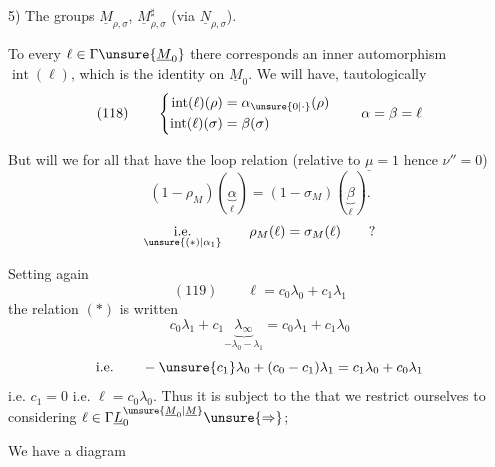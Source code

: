 
5) The groups $\underline M_{\rho,\sigma}$, $\underline M_{\rho,\sigma}^{\sharp}$ (via $\underline N_{\rho,\sigma}$).

To every $\ell\in\Gamma\unsure{\underline M_0}$ there corresponds an inner automorphism $\operatorname{int}(\ell)$, which is the identity on $\underline M_0$. We will have, tautologically
\[
(118)\qquad
\left\{\begin{aligned}
\operatorname{int}(\ell)(\rho)&=\alpha_{\unsure{0|\cdot}}(\rho)\\
\operatorname{int}(\ell)(\sigma)&=\beta(\sigma)
\end{aligned}\right.
\qquad\alpha=\beta=\ell
\]

But  will we for all that have the loop relation (relative to $\underline\mu=1$ hence $\nu''=0$)
\[
(1-\rho_M)(\underbrace{\alpha}_{\ell})=(1-\sigma_M)(\underbrace{\beta}_{\ell}).
\]
\[
\underset{\unsure{(*)|\alpha_1}}{\text{i.e.}}\qquad
\rho_M(\ell)=\sigma_M(\ell)\qquad ?
\]

Setting again
\[
(119)\qquad\ell=c_0\lambda_0+c_1\lambda_1
\]
the relation $(*)$ is written
\[
c_0\lambda_1+c_1\underbrace{\lambda_\infty}_{-\lambda_0-\lambda_1}
=c_0\lambda_1+c_1\lambda_0
\]
\[
\text{i.e.}\qquad-\unsure{c_1}\lambda_0+(c_0-c_1)\lambda_1
=c_1\lambda_0+c_0\lambda_1
\]
i.e. $c_1=0$ i.e. $\ell=c_0\lambda_0$. Thus it is subject to the  that we restrict ourselves to considering $\ell\in\Gamma\underline L_0^{\unsure{\underline M_0|\underline M}}\unsure{\Rightarrow}$; 


We have a  diagram

